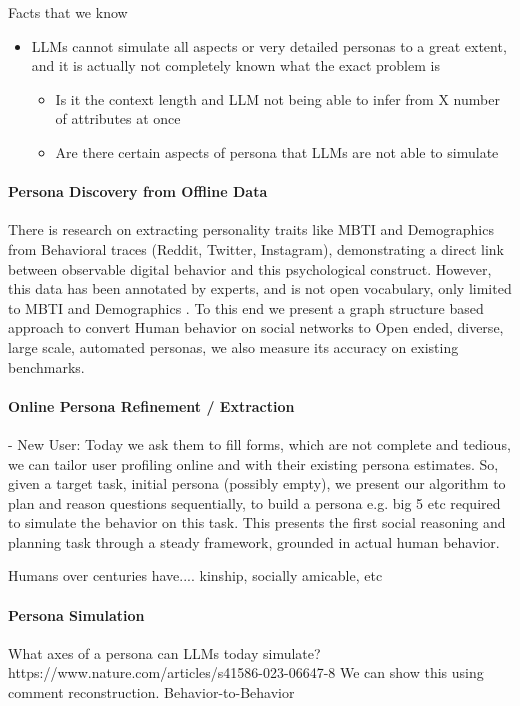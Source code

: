 Facts that we know
\begin{itemize}
    \item LLMs cannot simulate all aspects or very detailed personas to a great extent, and it is actually not completely known what the exact problem is
    \begin{itemize}
        \item Is it the context length and LLM not being able to infer from X number of attributes at once
        \item Are there certain aspects of persona that LLMs are not able to simulate
    \end{itemize}
\end{itemize}


\paragraph{Persona Discovery from Offline Data}
There is research on extracting personality traits like MBTI and Demographics from Behavioral traces (Reddit, Twitter, Instagram), demonstrating a direct link between observable digital behavior and this psychological construct. However, this data has been annotated by experts, and is not open vocabulary, only limited to MBTI and Demographics \cite{XXX}. To this end we present a graph structure based approach to convert Human behavior on social networks to Open ended, diverse, large scale, automated personas, we also measure its accuracy on existing benchmarks. 

\paragraph{Online Persona Refinement / Extraction}
- New User: Today we ask them to fill forms, which are not complete and tedious, we can tailor user profiling online and with their existing persona estimates. So, given a target task, initial persona (possibly empty), we present our algorithm to plan and reason questions sequentially, to build a persona e.g. big 5 etc required to simulate the behavior on this task. This presents the first social reasoning and planning task through a steady framework, grounded in actual human behavior.

Humans over centuries have.... kinship, socially amicable, etc

\paragraph{Persona Simulation}
What axes of a persona can LLMs today simulate? https://www.nature.com/articles/s41586-023-06647-8
We can show this using comment reconstruction. Behavior-to-Behavior

